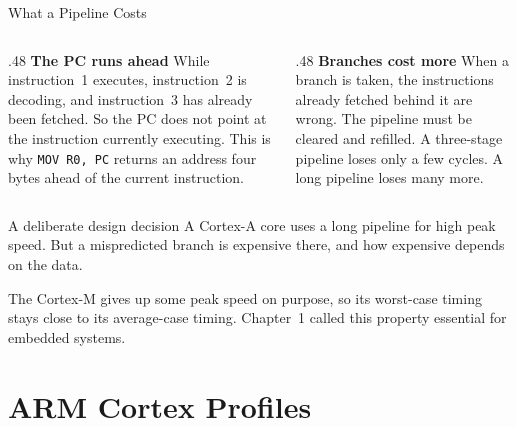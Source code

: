 \documentclass[9pt,aspectratio=169,xcolor=table]{beamer}
\begin{document}
\begin{frame}{What a Pipeline Costs}
    \begin{columns}[T]
    \begin{column}{.48\textwidth}
        \textbf{The PC runs ahead}
        \vspace{1mm}
        {\small While instruction~1 executes, instruction~2 is decoding, and instruction~3 has already been fetched. So the PC does not point at the instruction currently executing.}
        \vspace{2mm}
        {\small This is why \texttt{MOV R0, PC} returns an address four bytes ahead of the current instruction.}
    \end{column}
    \begin{column}{.48\textwidth}
        \textbf{Branches cost more}
        \vspace{1mm}
        {\small When a branch is taken, the instructions already fetched behind it are wrong. The pipeline must be cleared and refilled.}
        \vspace{2mm}
        {\small A three-stage pipeline loses only a few cycles. A long pipeline loses many more.}
    \end{column}
    \end{columns}
    \vspace{3mm}
    \begin{block}{A deliberate design decision}
        A Cortex-A core uses a long pipeline for high peak speed. But a mispredicted branch is expensive there, and how expensive depends on the data.

        The Cortex-M gives up some peak speed on purpose, so its worst-case timing stays close to its average-case timing. Chapter~1 called this property essential for embedded systems.
    \end{block}
\end{frame}


\section{ARM Cortex Profiles}
\end{document}
